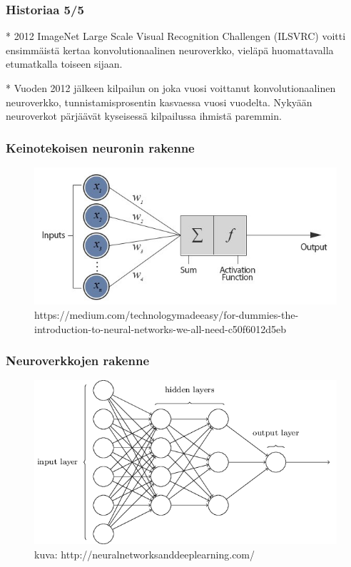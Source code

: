 \documentclass{beamer}
\begin{document}
\begin{frame}
    \frametitle{Historiaa 5/5}
    * 2012 ImageNet Large Scale Visual Recognition Challengen (ILSVRC) voitti ensimmäistä
    kertaa konvolutionaalinen neuroverkko, vieläpä huomattavalla etumatkalla toiseen sijaan.

    * Vuoden 2012 jälkeen kilpailun on joka vuosi voittanut konvolutionaalinen neuroverkko,
    tunnistamisprosentin kasvaessa vuosi vuodelta. Nykyään neuroverkot pärjäävät kyseisessä
    kilpailussa ihmistä paremmin.
\end{frame}

\begin{frame}
    \frametitle{Keinotekoisen neuronin rakenne}
    \begin{figure}[h]
        \label{pic:neuron}
        \centering
        \includegraphics[scale=0.5]{artificial_neuron}
                \caption{https://medium.com/technologymadeeasy/for-dummies-the-introduction-to-neural-networks-we-all-need-c50f6012d5eb}
    \end{figure}
\end{frame}

\begin{frame}
    \frametitle{Neuroverkkojen rakenne}
    \begin{figure}[h]
        \label{pic:neural_net}
        \centering
        \includegraphics[scale=0.5]{basic-neuralnet}
            \caption{kuva: http://neuralnetworksanddeeplearning.com/}
    \end{figure}
\end{frame}
\end{document}
